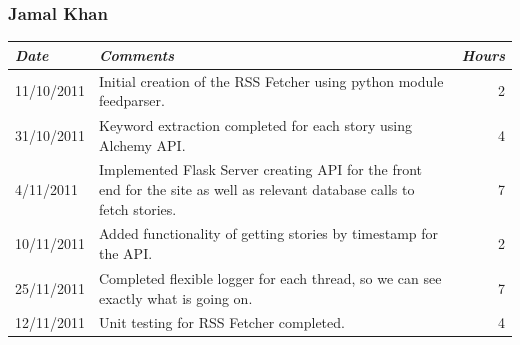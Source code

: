 \documentclass[a4paper,12pt]{article}
\begin{document}
	  \subsubsection{Jamal Khan}
	  \begin{tabular}{l | p{10cm} r}
     \emph{\large Date} & \emph{\large Comments} & \emph{\large Hours}\\
     \hline
	  11/10/2011 & Initial creation of the RSS Fetcher using python module feedparser. & 2\\
    31/10/2011 & Keyword extraction completed for each story using Alchemy API. & 4\\
    4/11/2011 & Implemented Flask Server creating API for the front end for the site as well as relevant database calls to fetch stories. & 7\\
    10/11/2011 & Added functionality of getting stories by timestamp for the API. & 2\\
    25/11/2011 & Completed flexible logger for each thread, so we can see exactly what is going on. & 7\\
    12/11/2011 & Unit testing for RSS Fetcher completed. & 4
  \end{tabular}
	
\end{document}
